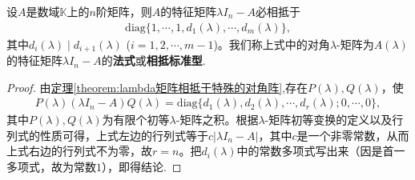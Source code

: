 \documentclass[../../main.tex]{subfiles}
\begin{document}
\begin{corollary}\label{corollary:特征矩阵的法式}
设$A$是数域$\mathbb{K}$上的$n$阶矩阵，则$A$的特征矩阵$\lambda I_n - A$必相抵于
\begin{align*}
\mathrm{diag}\{1,\cdots,1,d_1(\lambda),\cdots,d_m(\lambda)\},
\end{align*}
其中$d_i(\lambda)\mid d_{i + 1}(\lambda)$ ($i = 1,2,\cdots,m - 1$)。我们称上式中的对角$\lambda$-矩阵为$A(\lambda)$的特征矩阵$\lambda I_n-A$的\textbf{法式}或\textbf{相抵标准型}. 
\end{corollary}
\begin{proof}
由\hyperref[theorem:lambda矩阵相抵于特殊的对角阵]{定理\ref{theorem:lambda矩阵相抵于特殊的对角阵}},存在$P(\lambda),Q(\lambda)$，使
\begin{align*}
P(\lambda)(\lambda I_n - A)Q(\lambda)=\mathrm{diag}\{d_1(\lambda),d_2(\lambda),\cdots,d_r(\lambda);0,\cdots,0\},
\end{align*}
其中$P(\lambda),Q(\lambda)$为有限个初等$\lambda$-矩阵之积。根据$\lambda$-矩阵初等变换的定义以及行列式的性质可得，上式左边的行列式等于$c|\lambda I_n - A|$，其中$c$是一个非零常数，从而上式右边的行列式不为零，故$r = n$。把$d_i(\lambda)$中的常数多项式写出来（因是首一多项式，故为常数$1$），即得结论.
\end{proof}
\end{document}
